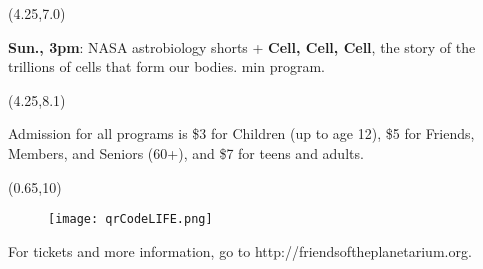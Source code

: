 \documentclass{article}
\begin{document}
\begin{textblock}{3.8}(4.25,7.0)

     {\fontsize{19}{19}

     \textbf{Sun., 3pm}: NASA astrobiology shorts +
     \textbf{Cell, Cell, Cell}, the story of the trillions of cells that form our bodies.
      \fontsize{11}{19} min program.

     }


\end{textblock}

\begin{textblock}{4}(4.25,8.1)

   {\fontsize{16}{27}

Admission for all programs is \$3 for Children (up to age 12), \$5 for Friends, Members, and Seniors (60+), and \$7 for teens and adults.

   }
\end{textblock}

\begin{textblock}{7}(0.65,10)

   {\fontsize{18}{24}

\begin{wrapfigure}{r}{0.8in}
   \texttt{[image: qrCodeLIFE.png]}
\end{wrapfigure}      

For tickets and more information, go to
http://friendsoftheplanetarium.org.

}



\end{textblock}
\end{document}
